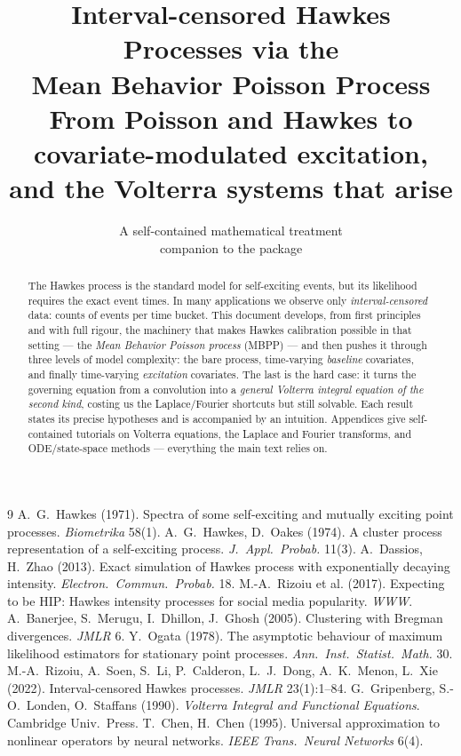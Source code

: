 \documentclass[11pt]{article}
\title{\textbf{Interval-censored Hawkes Processes via the\\ Mean Behavior Poisson Process}\\[4pt]
\large From Poisson and Hawkes to covariate-modulated excitation,\\ and the Volterra systems that arise}
\author{A self-contained mathematical treatment\\
\normalsize companion to the \code{hawkes\_calibration} package}
\date{}
\theoremstyle{plain}
\theoremstyle{definition}
\theoremstyle{remark}
\begin{document}
\maketitle

\begin{abstract}
\noindent
The Hawkes process is the standard model for self-exciting events, but its
likelihood requires the exact event times. In many applications we observe only
\emph{interval-censored} data: counts of events per time bucket. This document
develops, from first principles and with full rigour, the machinery that makes
Hawkes calibration possible in that setting --- the \emph{Mean Behavior Poisson
process} (MBPP) --- and then pushes it through three levels of model complexity:
the bare process, time-varying \emph{baseline} covariates, and finally
time-varying \emph{excitation} covariates. The last is the hard case: it turns
the governing equation from a convolution into a \emph{general Volterra integral
equation of the second kind}, costing us the Laplace/Fourier shortcuts but still
solvable. Each result states its precise hypotheses and is accompanied by an
intuition. Appendices give self-contained tutorials on Volterra equations, the
Laplace and Fourier transforms, and ODE/state-space methods --- everything the
main text relies on.
\end{abstract}

\tableofcontents
\bigskip








\appendix





\begin{thebibliography}{9}
\small
{} A.~G.~Hawkes (1971). Spectra of some self-exciting and mutually exciting point processes. \emph{Biometrika} 58(1).
 A.~G.~Hawkes, D.~Oakes (1974). A cluster process representation of a self-exciting process. \emph{J.~Appl.~Probab.} 11(3).
 A.~Dassios, H.~Zhao (2013). Exact simulation of Hawkes process with exponentially decaying intensity. \emph{Electron.~Commun.~Probab.} 18.
 M.-A.~Rizoiu et al. (2017). Expecting to be HIP: Hawkes intensity processes for social media popularity. \emph{WWW}.
 A.~Banerjee, S.~Merugu, I.~Dhillon, J.~Ghosh (2005). Clustering with Bregman divergences. \emph{JMLR} 6.
 Y.~Ogata (1978). The asymptotic behaviour of maximum likelihood estimators for stationary point processes. \emph{Ann.~Inst.~Statist.~Math.} 30.
 M.-A.~Rizoiu, A.~Soen, S.~Li, P.~Calderon, L.~J.~Dong, A.~K.~Menon, L.~Xie (2022). Interval-censored Hawkes processes. \emph{JMLR} 23(1):1--84.
 G.~Gripenberg, S.-O.~Londen, O.~Staffans (1990). \emph{Volterra Integral and Functional Equations}. Cambridge Univ.~Press.
 T.~Chen, H.~Chen (1995). Universal approximation to nonlinear operators by neural networks. \emph{IEEE Trans.~Neural Networks} 6(4).
\end{thebibliography}
\end{document}

